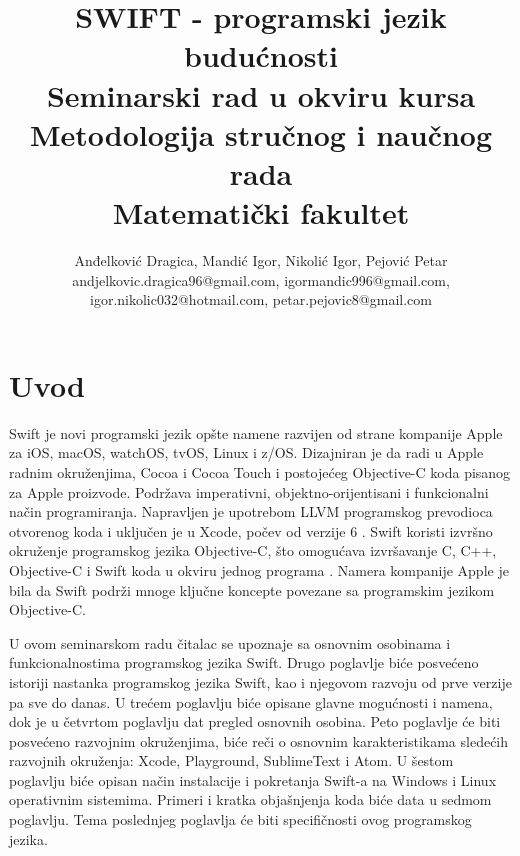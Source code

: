 \documentclass[a4paper]{article}
\begin{document}
\title{SWIFT - programski jezik budućnosti\\ \small{Seminarski rad u okviru kursa\\Metodologija stručnog i naučnog rada\\ Matematički fakultet}}

\author{Anđelković Dragica, Mandić Igor, Nikolić Igor, Pejović Petar\\ andjelkovic.dragica96@gmail.com,  igormandic996@gmail.com, \\ igor.nikolic032@hotmail.com, petar.pejovic8@gmail.com}


\maketitle



\tableofcontents

\newpage

\section{Uvod}
\label{sec:uvod}
Swift je novi programski jezik opšte namene razvijen od strane kompanije Apple za iOS, macOS, watchOS, tvOS, Linux i z/OS. Dizajniran je da radi u Apple radnim okruženjima, Cocoa i Cocoa Touch i postojećeg Objective-C koda pisanog za Apple proizvode. Podržava imperativni, objektno-orijentisani i funkcionalni način programiranja. Napravljen je upotrebom LLVM programskog prevodioca otvorenog koda i uključen je u Xcode, počev od verzije 6 \cite{swift_sajt}. Swift koristi izvršno okruženje programskog jezika Objective-C, što omogućava izvršavanje C, C++, Objective-C i Swift koda u okviru jednog programa \cite{arc_sajt}.
Namera kompanije Apple je bila da Swift podrži mnoge ključne koncepte povezane sa programskim jezikom Objective-C.

 U ovom seminarskom radu čitalac se upoznaje sa osnovnim osobinama i funkcionalnostima programskog jezika Swift. Drugo poglavlje biće posvećeno istoriji nastanka programskog jezika Swift, kao i njegovom razvoju od prve verzije pa sve do danas. U trećem poglavlju biće opisane glavne mogućnosti i namena, dok je u četvrtom poglavlju dat pregled osnovnih osobina. Peto poglavlje će biti posvećeno razvojnim okruženjima, biće reči o osnovnim karakteristikama sledećih razvojnih okruženja: Xcode, Playground, SublimeText i Atom. U šestom poglavlju biće opisan način instalacije i pokretanja Swift-a na Windows i Linux operativnim sistemima. Primeri i kratka objašnjenja koda biće data u sedmom poglavlju. Tema poslednjeg poglavlja će biti specifičnosti ovog programskog jezika.
\end{document}

